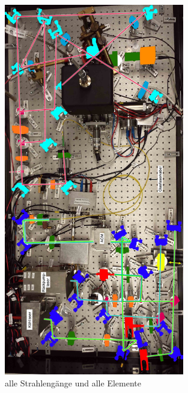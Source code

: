 \documentclass[
class=book,
accentcolor=1b,
custommargins=geometry,
fontsize=11pt,
thesis={type=Versuchsanleitung},
ruledheaders=all,
headline=false,
instbox=false,
marginpar=false,
title=small,
ignore-missing-data=true,
twoside=false,
logofile=apqdesign/tuda_logo.pdf,
pdfa=false %
]{apqpub}
\begin{document}
					\begin{figure}
						\centering
						\includegraphics[width=0.7\textwidth]{graphics/AEGBg.jpg}
						\caption{alle Strahlengänge und alle Elemente}
						\label{fig:AEGB}
					\end{figure}

\newpage



\end{document}
